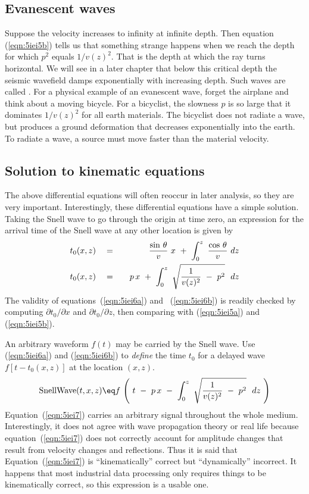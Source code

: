 \subsection{Evanescent waves}
Suppose the velocity increases to infinity at infinite depth.
Then equation (\ref{eqn:5iei5b}) tells us that something
strange happens when we reach the depth for which
$p^2$ equals $1/v(z)^2$.
That is the depth at which the ray turns horizontal.
We will see in a later chapter that below this critical depth
the seismic wavefield damps exponentially with increasing depth.
Such waves are called .
For a physical example of an evanescent wave,
forget the airplane and think about a moving bicycle.
For a bicyclist, the slowness $p$ is so large that it dominates $1/v(z)^2$
for all earth materials.
The bicyclist does not radiate a wave,
but produces a ground deformation
that decreases exponentially into the earth.
To radiate a wave,
a source must move faster than the material velocity.

\subsection{Solution to kinematic equations}
\par
The above differential equations will often reoccur in later analysis,
so they are very important.
Interestingly, these differential equations have a simple solution.
Taking the Snell wave to go through the origin at time zero,
an expression for the 
arrival time of the Snell wave at any other location
is given by
\begin{eqnarray}
t_0(x,z) \ \ \ &=&\ \ \ {\sin\,\theta  \over v }\  x\ +\ \int_0^z\ 
{\cos\,\theta  \over v }\ d z 
\label{eqn:5iei6a}
\\
t_0(x,z)\ \ \ &=&\ \ \ p\,x\ +\ \int_0^z\ 
\sqrt{ {1 \over v ( z ) ^2 }\ -\ 
p^2 } \ \ d z 
\label{eqn:5iei6b}
\end{eqnarray}
The validity of equations~(\ref{eqn:5iei6a}) and~ (\ref{eqn:5iei6b})
is readily checked by
computing  $\partial t_0 / \partial x$  and  $\partial t_0 / \partial z $,
then comparing with (\ref{eqn:5iei5a}) and (\ref{eqn:5iei5b}).

\par
An arbitrary waveform  $f(t)$  may be carried by the Snell wave.
Use (\ref{eqn:5iei6a}) and (\ref{eqn:5iei6b}) to {\em  define} the time $t_0$ for
a delayed wave  $f[t-t_0 (x,z)]$  at the location  $(x,z)$.
\begin{equation}
\hbox{SnellWave}(t,x,z)\eq f \, \left( \  t\ -\ 
p\,x\ -\  \int_0^z\ 
\sqrt{ {1 \over v ( z )^2}\ -\ p^2 } \ \ dz \  \right)
\label{eqn:5iei7}
\end{equation}
Equation~(\ref{eqn:5iei7})
carries an arbitrary signal throughout the whole medium.
Interestingly, it does not agree with wave propagation theory
or real life because
equation~(\ref{eqn:5iei7}) does not correctly account for amplitude
changes that result from
velocity changes and reflections.
Thus it is said that
Equation~(\ref{eqn:5iei7})
is ``kinematically'' correct but ``dynamically'' incorrect.
It happens that most industrial data processing only requires
things to be kinematically correct,
so this expression is a usable one.

